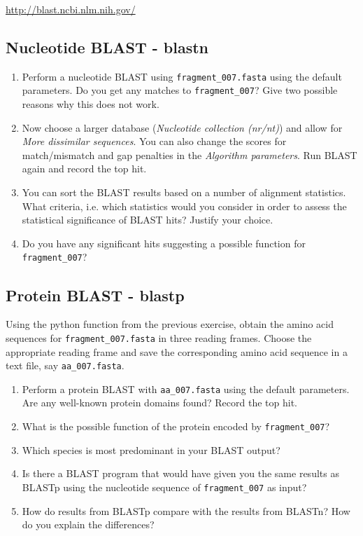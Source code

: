 \documentclass[a4paper,11pt]{article}
\begin{document}
\url{http://blast.ncbi.nlm.nih.gov/}

\subsection{Nucleotide BLAST - blastn}

\begin{enumerate}
\item Perform a nucleotide BLAST using \texttt{fragment\_007.fasta} using the default parameters. Do you get any matches to \texttt{fragment\_007}? Give two possible reasons why this does not work.
\item Now choose a larger database (\textit{Nucleotide collection (nr/nt)}) and allow for \textit{More dissimilar sequences}. You can also change the scores for match/mismatch and gap penalties in the \textit{Algorithm parameters}. Run BLAST again and record the top hit.
\item You can sort the BLAST results based on a number of alignment statistics. What criteria, i.e. which statistics would you consider in order to assess the statistical significance of BLAST hits? Justify your choice. 
\item Do you have any significant hits suggesting a possible function for \texttt{fragment\_007}? 
\end{enumerate}

\subsection{Protein BLAST - blastp}

Using the python function from the previous exercise, obtain the amino acid sequences for \texttt{fragment\_007.fasta} in three reading frames. Choose the appropriate reading frame and save the corresponding amino acid sequence in a text file, say  \texttt{aa\_007.fasta}.\\

\begin{enumerate}
\item Perform a protein BLAST with \texttt{aa\_007.fasta} using the default parameters. Are any well-known protein domains found? Record the top hit.
\item What is the possible function of the protein encoded by \texttt{fragment\_007}?
\item Which species is most predominant in your BLAST output?
\item Is there a BLAST program that would have given you the same results as BLASTp using the nucleotide sequence of \texttt{fragment\_007} as input?
\item How do results from BLASTp compare with the results from BLASTn? How do you explain the differences? 
\end{enumerate}
\end{document}

